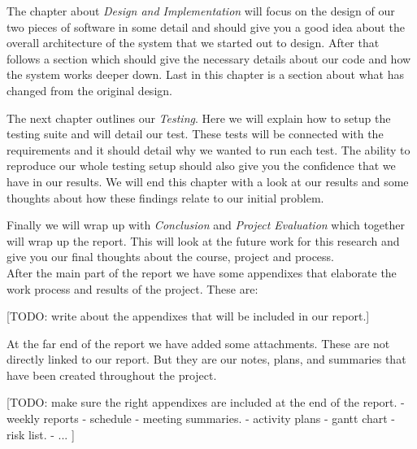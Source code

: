     The chapter about \emph{Design and Implementation} will focus on the design of our two pieces of software in some detail and should give you a good idea about the overall architecture of the system that we started out to design. After that follows a section which should give the necessary details about our code and how the system works deeper down. Last in this chapter is a section about what has changed from the original design.
    
    The next chapter outlines our \emph{Testing}. Here we will explain how to setup the testing suite and will detail our test. These tests will be connected with the requirements and it should detail why we wanted to run each test. The ability to reproduce our whole testing setup should also give you the confidence that we have in our results. We will end this chapter with a look at our results and some thoughts about how these findings relate to our initial problem.
    
    Finally we will wrap up with \emph{Conclusion} and \emph{Project Evaluation} which together will wrap up the report. This will look at the future work for this research and give you our final thoughts about the course, project and process.
    \\
    
    After the main part of the report we have some appendixes that elaborate the work process and results of the project. These are: 
    
    [TODO: write about the appendixes that will be included in our report.]
    
    At the far end of the report we have added some attachments. These are not directly linked to our report. But they are our notes, plans, and summaries that have been created throughout the project. 
    
    [TODO: make sure the right appendixes are included at the end of the report.
    - weekly reports
    - schedule
    - meeting summaries. 
    - activity plans
    - gantt chart
    - risk list. 
    - ...
    ]\\
    
